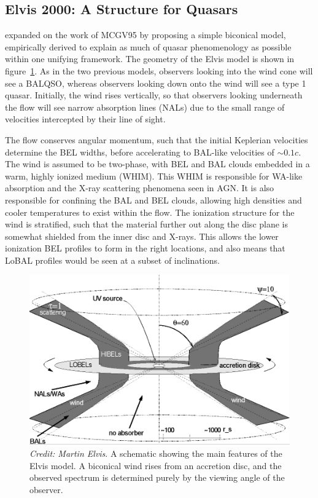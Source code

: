 \subsection{Elvis 2000: A Structure for Quasars}

\cite{elvis2000} expanded on the work of MCGV95 by proposing a simple
biconical model, empirically derived to explain as much of quasar phenomenology
as possible within one unifying framework. The geometry of the Elvis model
is shown in figure~\ref{fig:elvis}. As in the two previous models, observers 
looking into the wind cone will see a BALQSO, whereas observers looking down onto
the wind will see a type 1 quasar. Initially, the wind rises vertically, so
that observers looking underneath the flow will see narrow absorption lines (NALs)
due to the small range of velocities intercepted by their line of sight. 

The flow conserves angular momentum, such that the initial Keplerian velocities
determine the BEL widths, before accelerating to BAL-like velocities of $\sim0.1c$.
The wind is assumed to be two-phase, with BEL and BAL clouds embedded in 
a warm, highly ionized medium (WHIM). This WHIM is responsible for WA-like absorption
and the X-ray scattering phenomena seen in AGN. It is also responsible for confining
the BAL and BEL clouds, allowing high densities and cooler temperatures to exist
within the flow. The ionization structure for the wind is stratified, such that the material
further out along the disc plane is somewhat shielded from the inner disc and X-rays.
This allows the lower ionization BEL profiles to form in the right locations,
and also means that LoBAL profiles would be seen at a subset of inclinations.

\begin{figure}
\centering
\includegraphics[width=1.0\textwidth]{figures/02-outflows/elvis.png}
\caption
{
{\sl Credit: Martin Elvis}. 
A schematic showing the main features of the Elvis model. A biconical
wind rises from an accretion disc, and the observed spectrum is determined 
purely by the viewing angle of the observer.
} 
\label{fig:elvis}
\end{figure}

